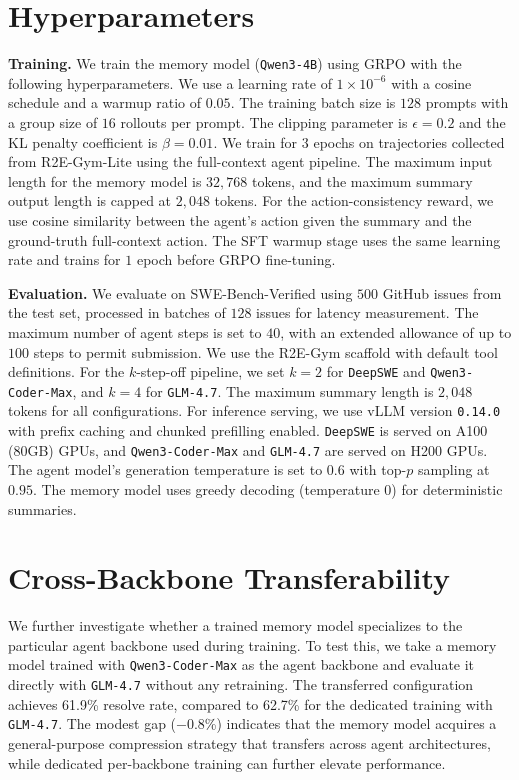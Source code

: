\documentclass{article}
\theoremstyle{plain}
\theoremstyle{definition}
\theoremstyle{remark}
\begin{document}
\section{Hyperparameters}
\label{app:hyperparameters}

\noindent \textbf{Training.}
We train the memory model (\texttt{Qwen3-4B}) using GRPO with the following hyperparameters. We use a learning rate of $1 \times 10^{-6}$ with a cosine schedule and a warmup ratio of $0.05$. The training batch size is $128$ prompts with a group size of $16$ rollouts per prompt. The clipping parameter is $\epsilon=0.2$ and the KL penalty coefficient is $\beta=0.01$. We train for $3$ epochs on trajectories collected from R2E-Gym-Lite using the full-context agent pipeline. The maximum input length for the memory model is $32{,}768$ tokens, and the maximum summary output length is capped at $2{,}048$ tokens. For the action-consistency reward, we use cosine similarity between the agent's action given the summary and the ground-truth full-context action. The SFT warmup stage uses the same learning rate and trains for $1$ epoch before GRPO fine-tuning.

\noindent \textbf{Evaluation.}
We evaluate on SWE-Bench-Verified using $500$ GitHub issues from the test set, processed in batches of $128$ issues for latency measurement. The maximum number of agent steps is set to $40$, with an extended allowance of up to $100$ steps to permit submission. We use the R2E-Gym scaffold with default tool definitions. For the $k$-step-off pipeline, we set $k=2$ for \texttt{DeepSWE} and \texttt{Qwen3-Coder-Max}, and $k=4$ for \texttt{GLM-4.7}. The maximum summary length is $2{,}048$ tokens for all configurations. For inference serving, we use vLLM version \texttt{0.14.0} with prefix caching and chunked prefilling enabled. \texttt{DeepSWE} is served on A100 (80GB) GPUs, and \texttt{Qwen3-Coder-Max} and \texttt{GLM-4.7} are served on H200 GPUs. The agent model's generation temperature is set to $0.6$ with top-$p$ sampling at $0.95$. The memory model uses greedy decoding (temperature $0$) for deterministic summaries.

\section{Cross-Backbone Transferability}
\label{app:transfer}

We further investigate whether a trained memory model specializes to the particular agent backbone used during training. To test this, we take a memory model trained with \texttt{Qwen3-Coder-Max} as the agent backbone and evaluate it directly with \texttt{GLM-4.7} without any retraining. The transferred configuration achieves 61.9\% resolve rate, compared to 62.7\% for the dedicated training with \texttt{GLM-4.7}. The modest gap ($-$0.8\%) indicates that the memory model acquires a general-purpose compression strategy that transfers across agent architectures, while dedicated per-backbone training can further elevate performance.
\end{document}
